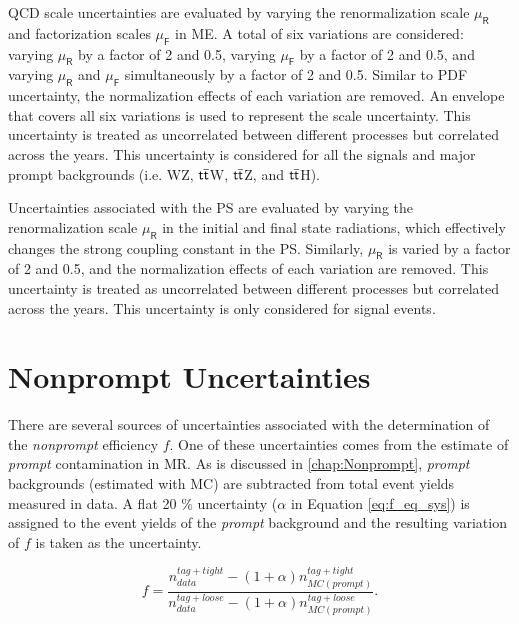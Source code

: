 \ac{QCD} scale uncertainties are evaluated by varying the renormalization scale $\mu_\textsf{R}$ and factorization scales $\mu_\textsf{F}$ in \ac{ME}. A total of six variations are considered: varying $\mu_\textsf{R}$ by a factor of 2 and 0.5, varying $\mu_\textsf{F}$ by a factor of 2 and 0.5, and varying $\mu_\textsf{R}$ and $\mu_\textsf{F}$ simultaneously by a factor of 2 and 0.5. Similar to PDF uncertainty, the normalization effects of each variation are removed. An envelope that covers all six variations is used to represent the scale uncertainty. This uncertainty is treated as uncorrelated between different processes but correlated across the years. This uncertainty is considered for all the signals and major prompt backgrounds (i.e. WZ, $\textsf{t}\overline{\textsf{t}}$W, $\textsf{t}\overline{\textsf{t}}$Z, and $\textsf{t}\overline{\textsf{t}}$H).

Uncertainties associated with the \ac{PS} are evaluated by varying the renormalization scale $\mu_\textsf{R}$ in the initial and final state radiations, which effectively changes the strong coupling constant in the \ac{PS}. Similarly, $\mu_\textsf{R}$ is varied by a factor of 2 and 0.5, and the normalization effects of each variation are removed. This uncertainty is treated as uncorrelated between different processes but correlated across the years. This uncertainty is only considered for signal events.

\section{Nonprompt Uncertainties}
\label{sec:NonUnc}

There are several sources of uncertainties associated with the determination of the \emph{nonprompt} efficiency $f$. One of these uncertainties comes from the estimate of \emph{prompt} contamination in \ac{MR}. As is discussed in \autoref{chap:Nonprompt}, \emph{prompt} backgrounds (estimated with \ac{MC}) are subtracted from total event yields measured in data. A flat 20 $\%$ uncertainty ($\alpha$ in Equation \ref{eq:f_eq_sys}) is assigned to the event yields of the \emph{prompt} background and the resulting variation of $f$ is taken as the uncertainty.

\begin{equation}
f=\frac{n_{data}^{tag+tight}-(1+\alpha)n_{MC(prompt)}^{tag+tight}}{n_{data}^{tag+loose}-(1+\alpha)n_{MC(prompt)}^{tag+loose}}.
\label{eq:f_eq_sys}
\end{equation}  

